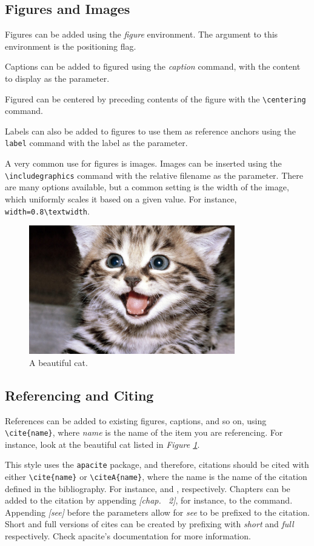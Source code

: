 \subsection{Figures and Images}
Figures can be added using the \textit{figure} environment.  The argument to this environment is the positioning flag.

Captions can be added to figured using the \textit{caption} command, with the content to display as the parameter.

Figured can be centered by preceding contents of the figure with the \verb;\centering; command.

Labels can also be added to figures to use them as reference anchors using the \verb;label; command with the label as the parameter.

A very common use for figures is images.  Images can be inserted using the \verb;\includegraphics; command with the relative filename as the parameter.  There are many options available, but a common setting is the width of the image, which uniformly scales it based on a given value.  For instance, \verb;width=0.8\textwidth;.
\begin{figure}[H]
	\centering
	\includegraphics[width=0.8\textwidth]{cat.jpg}
	\caption{A beautiful cat.}
	\label{fig:beautiful_cat}
\end{figure}

\subsection{Referencing and Citing}
References can be added to existing figures, captions, and so on, using \verb;\cite{name};, where \textit{name} is the name of the item you are referencing.  For instance, look at the beautiful cat listed in \textit{Figure \ref{fig:beautiful_cat}}.

This style uses the \verb;apacite; package, and therefore, citations should be cited with either \verb;\cite{name}; or \verb;\citeA{name};, where the name is the name of the citation defined in the bibliography.  For instance, \cite{gamma1994design} and , respectively.  Chapters can be added to the citation by appending \textit{[chap. ~2]}, for instance, to the command.  Appending \textit{[see]} before the parameters allow for \textit{see} to be prefixed to the citation.  Short and full versions of cites can be created by prefixing with \textit{short} and \textit{full} respectively.  Check apacite's documentation for more information.
